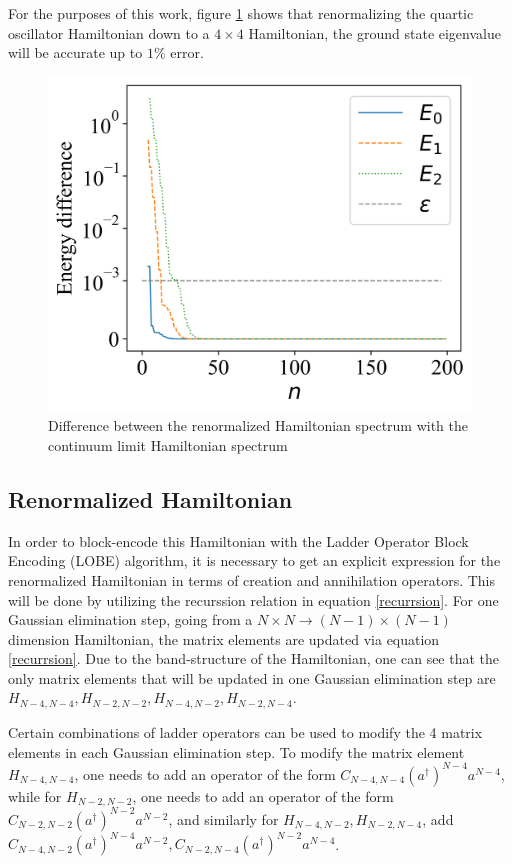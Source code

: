\documentclass[%
 reprint,
nofootinbib,
 amsmath,amssymb,
 aps,
]{revtex4-2}
\numberwithin{equation}{section}
\begin{document}
For the purposes of this work, figure \ref{qosc_renorm_eigvals} shows that renormalizing the quartic oscillator Hamiltonian down to a $4 \times 4$ Hamiltonian, the ground state eigenvalue will be accurate up to $1\%$ error. 

\begin{figure}
  \label{qosc_renorm_eigvals}
  \includegraphics[width = \linewidth]{figures/qosc_renorm_eigvals.png}
  \caption{Difference between the renormalized Hamiltonian spectrum with the continuum limit Hamiltonian spectrum}
\end{figure}

\subsection{Renormalized Hamiltonian}
In order to block-encode this Hamiltonian with the Ladder Operator Block Encoding (LOBE) algorithm, it is necessary to get an explicit expression for the renormalized Hamiltonian in terms of creation and annihilation operators. 
This will be done by utilizing the recurssion relation in equation \ref{recurrsion}. For one Gaussian elimination step, going from a $N \times N \rightarrow (N - 1)\times (N - 1)$ dimension Hamiltonian, the matrix elements are updated via equation \ref{recurrsion}. Due to the band-structure of the Hamiltonian, one can see that the only matrix elements that will be updated in one Gaussian elimination step are $H_{N-4, N-4}, H_{N-2, N-2}, H_{N-4, N-2}, H_{N-2, N-4}$. 

Certain combinations of ladder operators can be used to modify the 4 matrix elements in each Gaussian elimination step. To modify the matrix element $H_{N-4, N-4}$, one needs to add an operator of the form $C_{N-4, N-4}(a^\dagger)^{N-4}a^{N-4}$, while for $H_{N-2, N-2}$, one needs to add an operator of the form $C_{N-2, N-2}(a^\dagger)^{N-2}a^{N-2}$, and similarly for $H_{N-4, N-2}, H_{N-2, N-4}$, add $C_{N-4, N-2}(a^\dagger)^{N-4}a^{N-2}, C_{N-2, N-4}(a^\dagger)^{N-2}a^{N-4}$.
\end{document}
